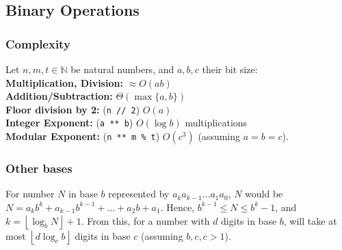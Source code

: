 \documentclass[]{article}
\newcommand\N     {\mathbb{N}}
\newcommand\rf    {\right\rfloor}
\newcommand\lf    {\left\lfloor}
\begin{document}
\begin{multicols}{2}
		\subsection{Binary Operations}
		\subsubsection{Complexity}
		Let $ n, m, t \in \N $ be natural numbers, and $ a, b, c $ their bit size: \\
		\textbf{Multiplication, Division: }$ \approx O(ab) $ \\
		\textbf{Addition/Subtraction: }$ \Theta(\max\{a, b\}) $ \\
		\textbf{Floor division by 2: }(\texttt{n // 2}) $ O(a) $ \\
		\textbf{Integer Exponent: }(\texttt{a ** b}) $ O(\log b) $ multiplications \\ 
		\textbf{Modular Exponent: }(\texttt{n ** m \% t}) $ O(c^3) $ (assuming $ a = b = c $). 
		\subsubsection{Other bases}
		For number $ N $ in base $ b $ represented by $ a_ka_{k - 1} \dots a_1a_0 $, $ N $ would be $ N = a_k b^k + a_{k - 1}b^{k - 1} + \dots + a_2b + a_1 $. Hence, $ b^{k - 1} \le N \le b^k - 1 $, and $ k = \lf \log_b N \rf + 1 $. From this, for a number with $d$ digits in base $b$, will take at most $\lf d \log_cb \rf$ digits in base $c$ (assuming $b, c, c > 1$). 
	\end{multicols}
	
	
\end{document}
